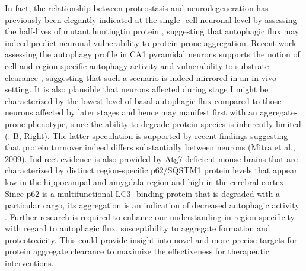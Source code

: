 In fact, the relationship between proteostasis and neurodegeneration has previously been elegantly indicated at the single- cell neuronal level by assessing the half-lives of mutant huntingtin protein \citep{Tsvetkov2013}, suggesting that autophagic flux may indeed predict neuronal vulnerability to protein-prone aggregation. Recent work assessing the autophagy profile in CA1 pyramidal neurons supports the notion of cell and region-specific autophagy activity and vulnerability to substrate clearance \citep{Bordi2016}, suggesting that such a scenario is indeed mirrored in an in vivo setting. It is also plausible that neurons affected during stage I might be characterized by the lowest level of basal autophagic flux compared to those neurons affected by later stages and hence may manifest first with an aggregate-prone phenotype, since the ability to degrade protein species is inherently limited (: B, Right). The latter speculation is supported by recent findings suggesting that protein turnover indeed differs substantially between neurons (Mitra et al., 2009). Indirect evidence is also provided by Atg7-deficient mouse brains that are characterized by distinct region-specific p62/SQSTM1 protein levels that appear low in the hippocampal and amygdala region and high in the cerebral cortex \citep{Komatsu2007}. Since p62 is a multifunctional LC3- binding protein that is degraded with a particular cargo, its aggregation is an indication of decreased autophagic activity \citep{Komatsu2007}. Further research is required to enhance our understanding in region-specificity with regard to autophagic flux, susceptibility to aggregate formation and proteotoxicity. This could provide insight into novel and more precise targets for protein aggregate clearance to maximize the effectiveness for therapeutic interventions. 

